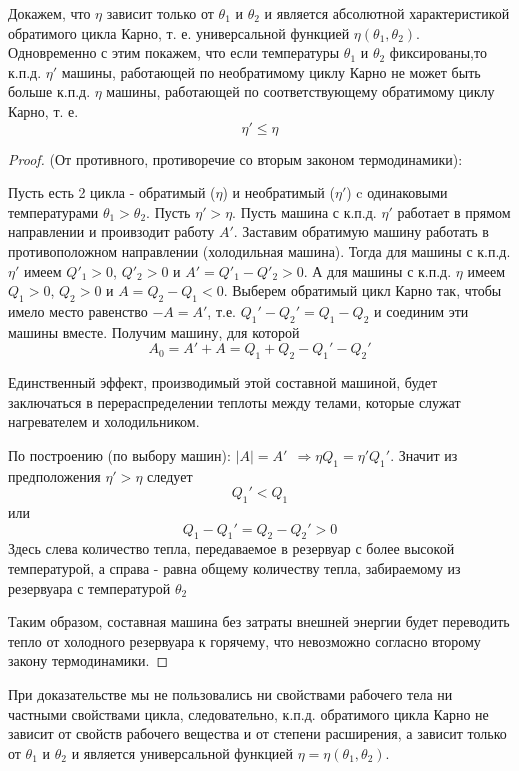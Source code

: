 Докажем, что $\eta$ зависит только от $\theta_1$ и $\theta_2$ и является абсолютной характеристикой обратимого цикла Карно, т. е. универсальной функцией $\eta(\theta_1, \theta_2)$. Одновременно с этим покажем,  что если температуры $\theta_1$ и $\theta_2$ фиксированы,то к.п.д. $\eta'$ машины, работающей по необратимому циклу Карно не может быть больше к.п.д. $\eta$ машины, работающей по соответствующему обратимому циклу Карно, т. е.
$$ \eta' \leq \eta $$
\begin{proof}
  (От противного, противоречие со вторым законом термодинамики):

  Пусть есть 2 цикла - обратимый ($\eta$) и необратимый ($\eta'$) c одинаковыми температурами $\theta_1 > \theta_2$. Пусть $\eta' > \eta$. Пусть машина с к.п.д. $\eta'$ работает в прямом направлении и проивзодит работу $A'$. Заставим обратимую машину работать в противоположном направлении (холодильная машина).  Тогда для машины с к.п.д. $\eta'$ имеем $Q'_1 > 0$, $Q'_2 > 0$ и $A' = Q'_1 - Q'_2 > 0$.  А для машины с к.п.д. $\eta$ имеем $Q_1 > 0$, $Q_2 > 0$ и $A = Q_2 - Q_1 < 0$. Выберем обратимый цикл Карно так, чтобы имело место равенство $-A = A'$, т.е. $Q_1' - Q_2' = Q_1 - Q_2$ и соединим эти машины вместе. Получим машину, для которой $$ A_0 = A' + A = Q_1 + Q_2 - Q_1' - Q_2' $$

  Единственный эффект, производимый этой составной машиной, будет заключаться в перераспределении теплоты между телами,  которые служат нагревателем и холодильником.

  По построению (по выбору машин): $|A| = A' \ \ \Rightarrow \eta Q_1 = \eta'Q_1' $. Значит из предположения $\eta' > \eta$ следует $$ Q_1' < Q_1 $$
  или $$ Q_1 - Q_1' = Q_2 - Q_2' > 0 $$
  Здесь слева количество тепла,  передаваемое в резервуар с более высокой температурой, а справа - равна общему количеству тепла, забираемому из резервуара с температурой $\theta_2$

  Таким образом, составная машина без затраты внешней энергии будет переводить тепло от холодного резервуара к горячему, что невозможно согласно второму закону термодинамики.

\end{proof}

При доказательстве мы не пользовались ни свойствами рабочего тела ни частными свойствами цикла, следовательно, к.п.д.  обратимого цикла Карно не зависит от свойств рабочего вещества и от степени расширения,  а зависит только от $\theta_1$ и $\theta_2$ и является универсальной функцией $\eta = \eta(\theta_1, \theta_2)$.

